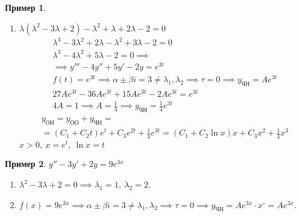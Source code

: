 \documentclass[11pt,a4paper,oneside]{report}
\theoremstyle{definition}
\newtheorem{example}{Пример}
\theoremstyle{plain}
\theoremstyle{remark}
\begin{document}
\begin{example}
\begin{enumerate}
        \item $\lambda(\lambda^2 - 3\lambda + 2) - \lambda^2 + \lambda + 2\lambda -2 = 0$
              \begin{align*}
                  \lambda^3 - 3\lambda^2 + 2\lambda - \lambda^2 + 3\lambda - 2 = 0                                                         \\
                  \lambda^3 - 4\lambda^2 + 5\lambda - 2 = 0 \implies                                                                       \\
                  \implies y''' - 4y'' + 5y' - 2y = e^{3t}                                                                                 \\
                  f(t) = e^{3t} \implies \alpha \pm \beta i = 3 \ne \lambda_1,\lambda_2 \implies \tau = 0 \implies y_{\text{ЧН}} = Ae^{3t} \\
                  27Ae^{3t} - 36Ae^{3t} + 15Ae^{3t} - 2Ae^{3t} = e^{3t}                                                                    \\
                  4A = 1 \implies A = \frac{1}{4} \implies y_{\text{ЧН}} = \frac{1}{4}e^{3t}
              \end{align*}
              \begin{multline*}
                  y_{\text{ОН}} = y_{\text{ОО}} + y_{\text{ЧН}} = \\
                  = (C_1 + C_2t)e^t + C_3e^{2t} + \frac{1}{4}e^{3t} = (C_1 + C_2\ln x)x + C_3x^2 + \frac{1}{4}x^3
              \end{multline*}
              $x > 0, \ x = e^t, \ \ln x = t$
    \end{enumerate}
\end{example}

\begin{example}
    $y'' - 3y' + 2y = 9e^{3x}$
    \begin{enumerate}
        \item $\lambda^2 - 3\lambda + 2 = 0 \implies \lambda_1 = 1, \ \lambda_2 = 2$.
        \item $f(x) = 9e^{3x} \implies \alpha \pm \beta i = 3 \ne \lambda_1, \lambda_2 \implies \tau = 0 \implies y_{\text{ЧН}} = Ae^{3x}\cdot x^\circ = Ae^{3x}$.
    \end{enumerate}
\end{example}
\end{document}
